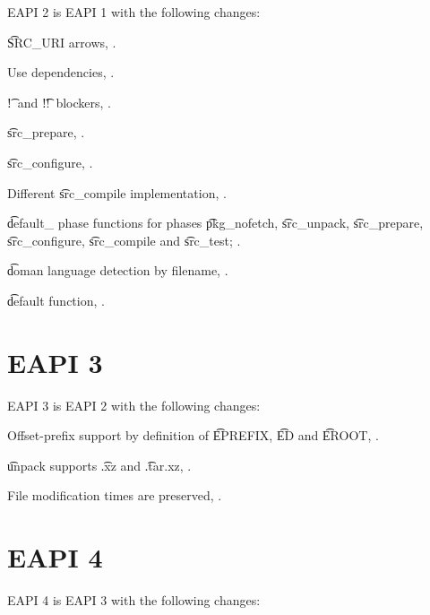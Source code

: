 EAPI 2 is EAPI 1 with the following changes:

\begin{compactitem}
\item \t{SRC_URI} arrows, .
\item Use dependencies, .
\item \t{!}\ and \t{!!}\ blockers, .
\item \t{src_prepare}, .
\item \t{src_configure}, .
\item Different \t{src_compile} implementation, .
\item \t{default_} phase functions for phases \t{pkg_nofetch}, \t{src_unpack}, \t{src_prepare},
    \t{src_configure}, \t{src_compile} and \t{src_test}; .
\item \t{doman} language detection by filename, .
\item \t{default} function, .
\end{compactitem}

\section*{EAPI 3}

EAPI 3 is EAPI 2 with the following changes:
\begin{compactitem}
\item Offset-prefix support by definition of \t{EPREFIX}, \t{ED} and \t{EROOT},
    .
\item \t{unpack} supports \t{.xz} and \t{.tar.xz}, .
\item File modification times are preserved, .
\end{compactitem}

\section*{EAPI 4}

EAPI 4 is EAPI 3 with the following changes:

